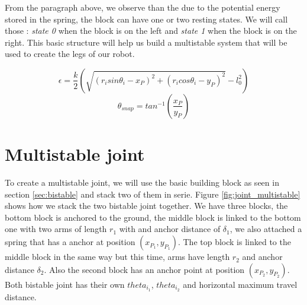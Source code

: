     From the paragraph above, we observe than the due to the potential energy stored in the spring, the block can have one or two resting states. We will call those : \textit{state 0} when the block is on the left and \textit{state 1} when the block is on the right. This basic structure will help us build a multistable system that will be used to create the legs of our robot.
    

    \begin{equation}
        \epsilon = \frac{k}{2}\left(\sqrt{(r_i sin\theta_i - x_P)^2 + (r_i cos\theta_i - y_P)^2} - l_0^2\right)    
        \label{eq:potential_single}
    \end{equation}
    \begin{equation}
        \theta_{snap} = tan^{-1}\left(\frac{x_P}{y_P}\right)    
        \label{eq:snap_angle}
    \end{equation}
    
    
    
    \section{Multistable joint}\label{sec:mutistable}
        To create a multistable joint, we will use the basic building block as seen in section \ref{sec:bistable} and stack two of them in serie. Figure \ref{fig:joint_multistable} shows how we stack the two bistable joint together. We have three blocks, the bottom block is anchored to the ground, the middle block is linked to the bottom one with two arms of length $r_1$ with and anchor distance of $\delta_1$, we also attached a spring that has a anchor at position $(x_{P_1}, y_{P_1})$. The top block is linked to the middle block in the same way but this time, arms have length $r_2$ and anchor distance $\delta_2$. Also the second block has an anchor point at position $(x_{P_2}, y_{P_2})$. 
        Both bistable joint has their own $theta_{i_1}$, $theta_{i_2}$ and horizontal maximum travel distance.
        
